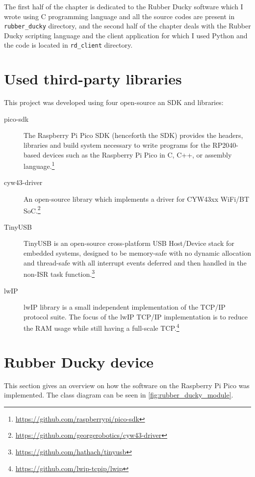 The first half of the chapter is dedicated to the Rubber Ducky software which I wrote using C programming language and all the source codes are present in \verb|rubber_ducky| directory, and the second half of the chapter deals with the Rubber Ducky scripting language and the client application for which I used Python and the code is located in \verb|rd_client| directory.

\section{Used third-party libraries}
This project was developed using four open-source an SDK and libraries:
\begin{description}
    \item [pico-sdk] The Raspberry Pi Pico SDK (henceforth the SDK) provides the headers, libraries and build system necessary to write programs for the RP2040-based devices such as the Raspberry Pi Pico in C, C++, or assembly language.\footnote{\url{https://github.com/raspberrypi/pico-sdk}}
    \item [cyw43-driver] An open-source library which implements a driver for CYW43xx WiFi/BT SoC.\footnote{\url{https://github.com/georgerobotics/cyw43-driver}}
    \item [TinyUSB] TinyUSB is an open-source cross-platform USB Host/Device stack for embedded systems, designed to be memory-safe with no dynamic allocation and thread-safe with all interrupt events deferred and then handled in the non-ISR task function.\footnote{\url{https://github.com/hathach/tinyusb}}
    \item [lwIP] lwIP library is a small independent implementation of the TCP/IP protocol suite. The focus of the lwIP TCP/IP implementation is to reduce the RAM usage while still having a full-scale TCP.\footnote{\url{https://github.com/lwip-tcpip/lwip}}
\end{description}

\section{Rubber Ducky device}
This section gives an overview on how the software on the Raspberry Pi Pico was implemented. The class diagram can be seen in \autoref{fig:rubber_ducky_module}.

